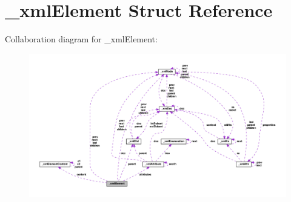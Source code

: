 \hypertarget{struct__xml_element}{\section{\-\_\-xml\-Element Struct Reference}
\label{struct__xml_element}
}


Collaboration diagram for \-\_\-xml\-Element\-:
\nopagebreak
\begin{figure}[H]
\begin{center}
\leavevmode
\includegraphics[width=350pt]{struct__xml_element__coll__graph}
\end{center}
\end{figure}
